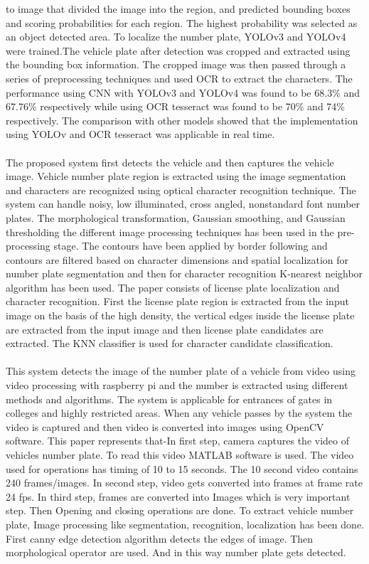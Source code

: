 to image that divided the image into the region, and predicted bounding boxes and scoring probabilities for each region. The highest probability was selected as an object detected area. To localize the number plate, YOLOv3 and YOLOv4 were trained.The vehicle plate after detection was cropped and extracted using the bounding box information.
The cropped image was then passed through a series of preprocessing techniques and used OCR to extract the characters.
The performance using CNN with YOLOv3 and YOLOv4 was found to be 68.3\% and 67.76\% respectively while using OCR tesseract was found to be 70\% and 74\% respectively. The comparison with other models showed that the implementation using YOLOv and OCR tesseract was applicable in real time.
\\
\\
\big[3\big] The proposed system first detects the vehicle and then captures the vehicle image. Vehicle number plate region is extracted using the image segmentation and characters are recognized using optical character recognition technique. The system can handle noisy, low illuminated, cross angled, nonstandard font number plates. The morphological transformation, Gaussian smoothing, and Gaussian thresholding the different image processing techniques has been used in the pre-processing stage. The contours have been applied by border following and contours are filtered based on character dimensions and spatial localization for number plate segmentation and then for character recognition K-nearest neighbor algorithm has been used.
The paper consists of license plate localization and character recognition. First the license plate region is extracted from the input image on the basis of the high density, the vertical edges inside the license plate are extracted from the input image and then license plate candidates are extracted. The \ac{KNN} classifier is used for character candidate classification.  
\\
\\
\big[4\big]This system detects the image of the number plate of a vehicle from video using video processing with raspberry pi and the number is extracted using different methods and algorithms. The system is applicable for entrances of gates in colleges and highly restricted areas. When any vehicle passes by the system the video is captured and then video is converted into images using OpenCV software. 
This paper represents that-In first step, camera captures the video of vehicles number plate. To read this video MATLAB software is used. The video used for operations has timing of 10 to 15 seconds. The 10 second video contains 240 frames/images. In second step, video gets converted into frames at frame rate 24 fps. In third step, frames are converted into Images which is very important step. Then Opening and closing operations are done. To extract vehicle number plate, Image processing like segmentation, recognition, localization has been done. First canny edge detection algorithm detects the edges of image. Then morphological operator are used. And in this way number plate gets detected.
